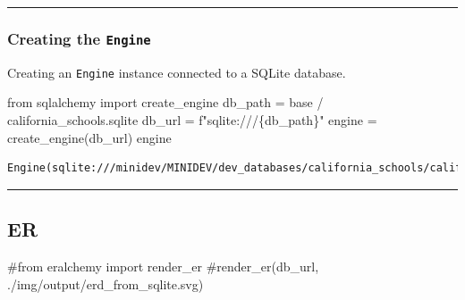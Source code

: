 \documentclass[
  letterpaper,
  DIV=11,
  numbers=noendperiod]{scrartcl}
\newenvironment{Shaded}{\begin{snugshade}}{\end{snugshade}}
\newcommand{\CommentTok}[1]{\textcolor[rgb]{0.37,0.37,0.37}{#1}}
\newcommand{\ImportTok}[1]{\textcolor[rgb]{0.00,0.46,0.62}{#1}}
\newcommand{\NormalTok}[1]{\textcolor[rgb]{0.00,0.23,0.31}{#1}}
\newcommand{\OperatorTok}[1]{\textcolor[rgb]{0.37,0.37,0.37}{#1}}
\newcommand{\SpecialCharTok}[1]{\textcolor[rgb]{0.37,0.37,0.37}{#1}}
\newcommand{\SpecialStringTok}[1]{\textcolor[rgb]{0.13,0.47,0.30}{#1}}
\newcommand{\StringTok}[1]{\textcolor[rgb]{0.13,0.47,0.30}{#1}}
\begin{document}
\begin{center}\rule{0.5\linewidth}{0.5pt}\end{center}

\subsubsection{\texorpdfstring{Creating the
\texttt{Engine}}{Creating the Engine}}\label{creating-the-engine}

Creating an \texttt{Engine} instance connected to a SQLite database.

\begin{Shaded}
\begin{Highlighting}[]
\ImportTok{from}\NormalTok{ sqlalchemy }\ImportTok{import}\NormalTok{ create\_engine}
\NormalTok{db\_path }\OperatorTok{=}\NormalTok{ base }\OperatorTok{/} \StringTok{\textquotesingle{}california\_schools.sqlite\textquotesingle{}}
\NormalTok{db\_url }\OperatorTok{=} \SpecialStringTok{f"sqlite:///}\SpecialCharTok{\{}\NormalTok{db\_path}\SpecialCharTok{\}}\SpecialStringTok{"}
\NormalTok{engine }\OperatorTok{=}\NormalTok{ create\_engine(db\_url)}
\NormalTok{engine}
\end{Highlighting}
\end{Shaded}

\begin{verbatim}
Engine(sqlite:///minidev/MINIDEV/dev_databases/california_schools/california_schools.sqlite)
\end{verbatim}

\begin{center}\rule{0.5\linewidth}{0.5pt}\end{center}

\subsection{ER}\label{er}

\begin{Shaded}
\begin{Highlighting}[]
\CommentTok{\#from eralchemy import render\_er}
\CommentTok{\#render\_er(db\_url, \textquotesingle{}./img/output/erd\_from\_sqlite.svg\textquotesingle{})}
\end{Highlighting}
\end{Shaded}
\end{document}
